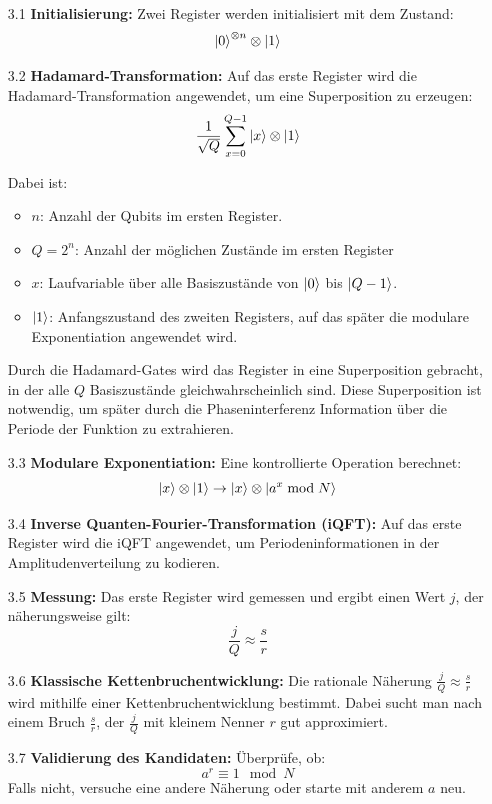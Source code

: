 \begin{enumerate}
  \item[3.1] \textbf{Initialisierung:}  
  Zwei Register werden initialisiert mit dem Zustand:
  \[
  \ket{0}^{\otimes n} \otimes \ket{1}
  \]

  \item[3.2] \textbf{Hadamard-Transformation:}  
  Auf das erste Register wird die Hadamard-Transformation angewendet, um eine Superposition zu erzeugen:
  \[
  \frac{1}{\sqrt{Q}} \sum_{x=0}^{Q-1} \ket{x} \otimes \ket{1}
  \]
  
  Dabei ist:
  \begin{itemize}
    \item \( n \): Anzahl der Qubits im ersten Register.
    \item \( Q = 2^n \): Anzahl der möglichen Zustände im ersten Register
    \item \( x \): Laufvariable über alle Basiszustände von \( \ket{0} \) bis \( \ket{Q-1} \).
    \item \( \ket{1} \): Anfangszustand des zweiten Registers, auf das später die modulare Exponentiation angewendet wird.
  \end{itemize}

  Durch die Hadamard-Gates wird das Register in eine Superposition gebracht, in der alle \( Q \) Basiszustände gleichwahrscheinlich sind. Diese Superposition ist notwendig, um später durch die Phaseninterferenz Information über die Periode der Funktion zu extrahieren.\\

  \item[3.3] \textbf{Modulare Exponentiation:}  
  Eine kontrollierte Operation berechnet:
  \[
  \ket{x} \otimes \ket{1} \rightarrow \ket{x} \otimes \ket{a^x \bmod N}
  \]

  \item[3.4] \textbf{Inverse Quanten-Fourier-Transformation (iQFT):}  
  Auf das erste Register wird die iQFT angewendet, um Periodeninformationen in der Amplitudenverteilung zu kodieren.\\

  \item[3.5] \textbf{Messung:}  
  Das erste Register wird gemessen und ergibt einen Wert \( j \), der näherungsweise gilt:
  \[
  \frac{j}{Q} \approx \frac{s}{r}
  \]

  \item[3.6] \textbf{Klassische Kettenbruchentwicklung:}  
  Die rationale Näherung \( \frac{j}{Q} \approx \frac{s}{r} \) wird mithilfe einer Kettenbruchentwicklung bestimmt.  
  Dabei sucht man nach einem Bruch \( \frac{s}{r} \), der \( \frac{j}{Q} \) mit kleinem Nenner \( r \) gut approximiert.\\

  \item[3.7] \textbf{Validierung des Kandidaten:}  
  Überprüfe, ob:
  \[
  a^r \equiv 1 \mod N
  \]
  Falls nicht, versuche eine andere Näherung oder starte mit anderem \( a \) neu.
\end{enumerate}

